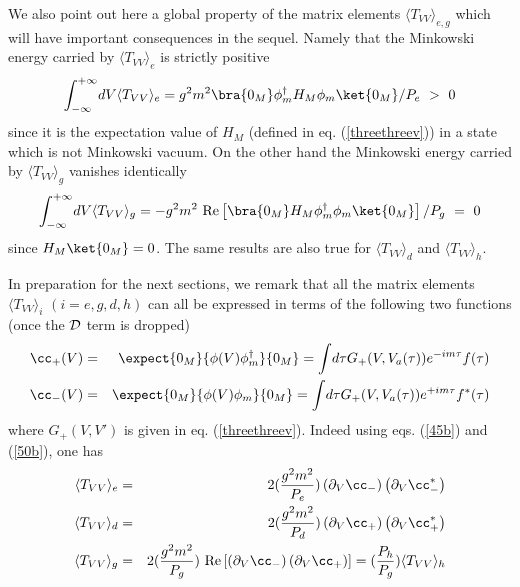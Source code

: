 \documentclass[12pt]{article}
\begin{document}
We also point out here a global property of the matrix elements
$\langle T_{VV}\rangle _{e,  g}$ which will have important consequences
in the sequel. Namely that the Minkowski energy carried by $\langle
T_{VV}\rangle _e$ is strictly positive  \begin{eqnarray}
\int^{+\infty}_{-\infty}\! dV \langle T_{VV}\rangle _e
= g^2m^2 \bra{0_M} \phi_m^\dagger H_M \phi_m
\ket{0_M}/ P_e\ >\ 0
\label{pos1}
\end{eqnarray}
since it is the expectation value of $H_M$ (defined in eq.
(\ref{threethreev})) in a
state which is not Minkowski vacuum. On the other hand the Minkowski energy
carried by $\langle T_{VV}\rangle _g$ vanishes identically
\begin{eqnarray}
\int^{+\infty}_{-\infty}\! dV \langle T_{VV}\rangle _g
= -g^2m^2 \mbox{ Re} \left[ \bra{0_M}  H_M \phi_m^\dagger \phi_m
\ket{0_M}\right]/ P_g \ =\ 0
\label{pos2}
\end{eqnarray}
since $H_M \ket{0_M}=0$. The same results are also true for
$\langle T_{VV}\rangle _{d}$ and $\langle T_{VV}\rangle _{h}$.

In preparation for the next sections,
we remark that
all the matrix elements $\langle T_{VV}\rangle _i$  $(i=e, g, d, h)$
can all be expressed in terms of the following two functions (once the ${\cal
{D}}$
term
is dropped)
\begin{eqnarray}
\cc_+ (V) &=& \expect{0_M} {\phi(V) \phi_m^\dagger }{0_M}
=
\int \! d\tau G_+(V,V_a (\tau)) e^{-i m \tau} f(\tau) \nonumber\\ \cc_-(V) &=&
\expect{0_M} {\phi(V) \phi_m}{0_M}
=
\int \! d\tau
G_+(V,V_a (\tau)) e^{+i m \tau} f^*(\tau) \label{threefivexiv} \end{eqnarray}
where $G_+(V,V')$ is given in eq. (\ref{threethreev}).
Indeed using eqs. (\ref{45b}) and (\ref{50b}), one has
\begin{eqnarray}
\langle T_{VV}\rangle _{e} &=&2 ({ g^2m^2 \over P_e})
\left( \partial_V \cc_- \right) \left( \partial_V \cc_-^* \right)
\nonumber\\
\langle T_{VV}\rangle _{d} &=&2 ({ g^2m^2 \over P_d})
\left( \partial_V \cc_+\right) \left( \partial_V \cc_+^* \right)
\nonumber\\
\langle T_{VV} \rangle _{g}
&=& 2 ({g^2m^2 \over P_g}) \mbox{ Re} \left[\left(  \partial_V \cc_- \right)
\left( \partial_V \cc_+
\right)\right]
= ({P_h \over P_g} ) \langle T_{VV} \rangle _{h}
\label{TVVi}
\end{eqnarray}
\end{document}
